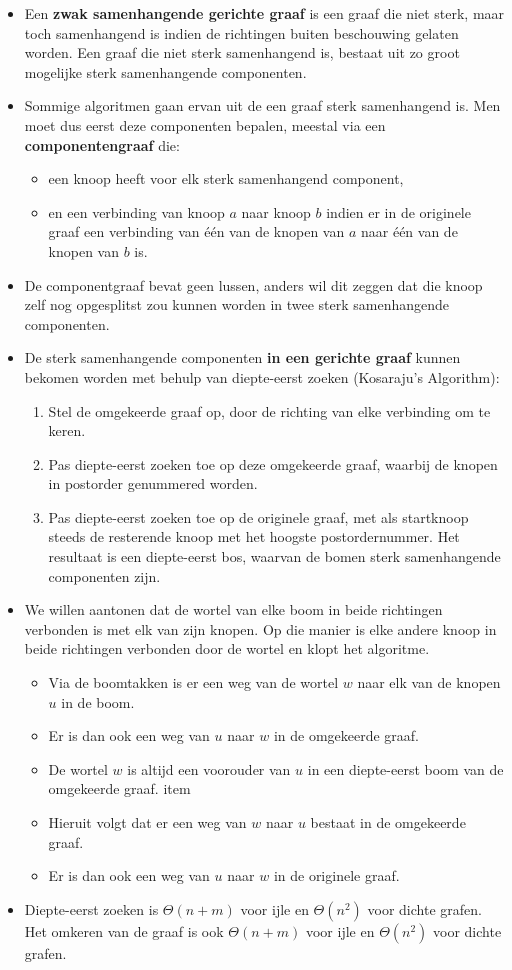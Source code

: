 \begin{itemize}
	\item Een \textbf{zwak samenhangende gerichte graaf} is een graaf die niet sterk, maar toch samenhangend is indien de richtingen buiten beschouwing gelaten worden. Een graaf die niet sterk samenhangend is, bestaat uit zo groot mogelijke sterk samenhangende componenten. 
	\item Sommige algoritmen gaan ervan uit de een graaf sterk samenhangend is. Men moet dus eerst deze componenten bepalen, meestal via een \textbf{componentengraaf} die:
	\begin{itemize}
		\item een knoop heeft voor elk sterk samenhangend component,
		\item en een verbinding van knoop $a$ naar knoop $b$ indien er in de originele graaf een verbinding van één van de knopen van $a$ naar één van de knopen van $b$ is. 
	\end{itemize}
	\item De componentgraaf bevat geen lussen, anders wil dit zeggen dat die knoop zelf nog opgesplitst zou kunnen worden in twee sterk samenhangende componenten.
	\item De sterk samenhangende componenten \textbf{in een gerichte graaf} kunnen bekomen worden met behulp van diepte-eerst zoeken (Kosaraju's Algorithm):
	\begin{enumerate}
		\item Stel de omgekeerde graaf op, door de richting van elke verbinding om te keren.
		\item Pas diepte-eerst zoeken toe op deze omgekeerde graaf, waarbij de knopen in postorder genummered worden.
		\item Pas diepte-eerst zoeken toe op de originele graaf, met als startknoop steeds de resterende knoop met het hoogste postordernummer. Het resultaat is een diepte-eerst bos, waarvan de bomen sterk samenhangende componenten zijn.
	\end{enumerate}
	\item We willen aantonen dat de wortel van elke boom in beide richtingen verbonden is met elk van zijn knopen.  Op die manier is elke andere knoop in beide richtingen verbonden door de wortel en klopt het algoritme.
	\begin{itemize}
		\item Via de boomtakken is er een weg van de wortel $w$ naar elk van de knopen $u$ in de boom. 
		\item Er is dan ook een weg van $u$ naar $w$ in de omgekeerde graaf.
		\item De wortel $w$ is altijd een voorouder van $u$ in een diepte-eerst boom van de omgekeerde graaf.
		item 
		\item Hieruit volgt dat er een weg van $w$ naar $u$ bestaat in de omgekeerde graaf.
		\item Er is dan ook een weg van $u$ naar $w$ in de originele graaf.
	\end{itemize}

	\item Diepte-eerst zoeken is $\Theta(n + m)$ voor ijle en $\Theta(n^2)$ voor dichte grafen. Het omkeren van de graaf is ook $\Theta(n + m)$ voor ijle en $\Theta(n^2)$ voor dichte grafen.
\end{itemize}
